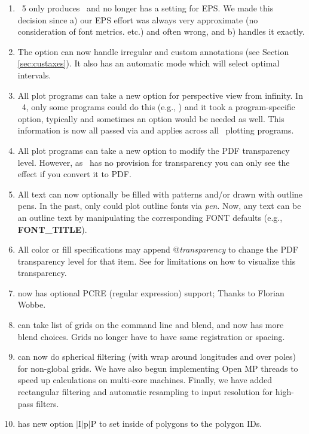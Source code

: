 \begin{enumerate}
	\item \GMT\ 5 only produces \PS\ and no longer has a setting for EPS.  We made this decision since a) our EPS effort was always
		very approximate (no consideration of font metrics. etc.) and often wrong, and b)  handles it exactly.
	\item The  option can now handle irregular and custom annotations (see Section \ref{sec:custaxes}).
		It also has an automatic mode which will select optimal intervals.
	\item All plot programs can take a new  option for perspective view from infinity.  In \GMT\ 4, only some
		programs could do this (e.g., ) and it took a program-specific option, typically  and
		sometimes an option  would be needed as well.  This information is now all passed via  and
		applies across all \GMT\ plotting programs.
	\item All plot programs can take a new  option to modify the PDF transparency level.  However, as \PS\ has
		no provision for transparency you can only see the effect if you convert it to PDF.
	\item All text can now optionally be filled with patterns and/or drawn with outline pens.  In the past, only
		 could plot outline fonts via \emph{pen}.  Now, any text can be an outline text
		by manipulating the corresponding FONT defaults (e.g., \textbf{FONT\_TITLE}).
	\item All color or fill specifications may append @\emph{transparency} to change the PDF transparency level for that item.
		See  for limitations on how to visualize this transparency.
	\item {} now has optional PCRE (regular expression) support; Thanks to Florian Wobbe.
	\item {} can take list of grids on the command line and blend, and now has more blend choices.  Grids no
		longer have to have same registration or spacing.
	\item {} can now do spherical filtering (with wrap around longitudes and over poles) for non-global grids.
		We have also begun implementing Open MP threads to speed up calculations on multi-core machines.  Finally, we have
		added rectangular filtering and automatic resampling to input resolution for high-pass filters.
	\item {} has new option $|$I$|$p$|$P to set inside of polygons to the polygon IDs.

\end{enumerate}
